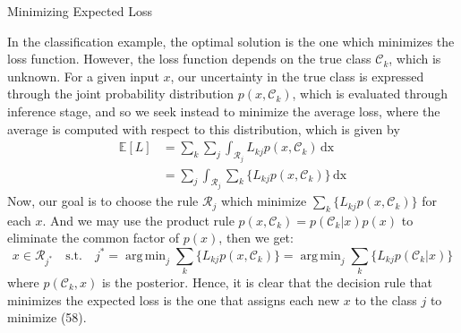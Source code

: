 \documentclass{bredelebeamer}
\DeclareMathOperator*{\argmin}{arg\,min}
\begin{document}
\begin{frame}{Minimizing Expected Loss}
  \begin{justify}

    In the classification example, the optimal solution is the one which minimizes
    the loss function. However, the loss function depends on the true class $\mathcal{C}_k$,
    which is unknown. For a given input $x$, our uncertainty in the true class
    is expressed through the joint probability distribution $p(x, \mathcal{C}_k)$, which
    is evaluated through inference stage, and so we seek instead to minimize the
    average loss, where the average is computed with respect to this distribution,
    which is given by
    \begin{equation}
      \begin{split}
        \mathbb{E}[L]
          &= \sum_k \sum_j \int_{\mathcal{R}_j} L_{kj} p(x, \mathcal{C}_k)\, \mathrm{dx} \\
          &= \sum_j \int_{\mathcal{R}_j} \sum_k \{L_{kj} p(x, \mathcal{C}_k)\}\, \mathrm{dx}
      \end{split}
    \end{equation}
    Now, our goal is to choose the rule $\mathcal{R}_j$ which minimize
    $\sum_k \{L_{kj} p(x, \mathcal{C}_k)\}$ for each $x$. And we may use the
    product rule  $p(x,\mathcal{C}_k) = p(\mathcal{C}_k|x)p(x)$ to eliminate
    the common factor of $p(x)$, then we get:
    \begin{equation}
      x \in \mathcal{R}_{j^*} \quad \textrm{s.t.} \quad j^*
      = \argmin_j \sum_k \{L_{kj} p(x, \mathcal{C}_k)\}
      = \argmin_j \sum_k \{L_{kj} p(\mathcal{C}_k | x)\}
    \end{equation}
    where $p(\mathcal{C}_k, x)$ is the posterior. Hence, it is clear that the
    decision rule that minimizes the expected loss is the one that assigns each
    new $x$ to the class $j$ to minimize (58).
  \end{justify}
\end{frame}
\end{document}
